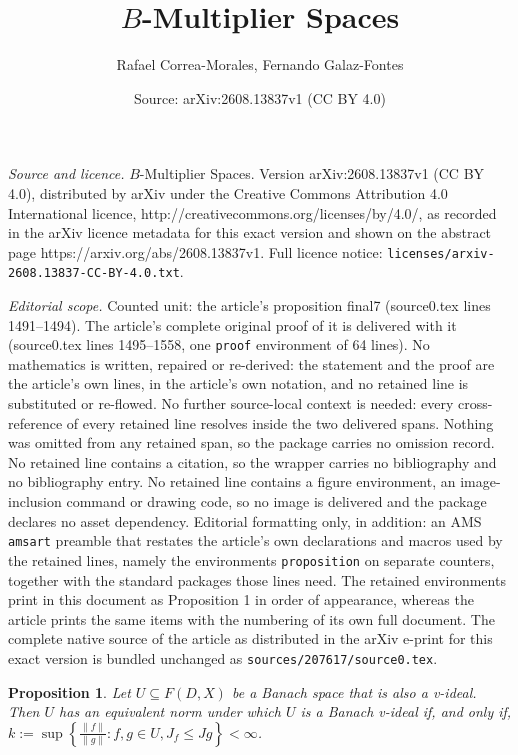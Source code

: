 \documentclass[10pt,a4paper]{amsart}
\title{$B$-Multiplier Spaces}
\author{Rafael Correa-Morales, Fernando Galaz-Fontes}
\date{Source: arXiv:2608.13837v1 (CC BY 4.0)}
\newtheorem{proposition}{Proposition}
\providecommand{\llave}[1]{\left\lbrace #1\right\rbrace }
\begin{document}
\maketitle

\noindent\emph{Source and licence.} $B$-Multiplier Spaces. Version arXiv:2608.13837v1 (CC BY 4.0), distributed by arXiv under the Creative Commons Attribution 4.0 International licence, http://creativecommons.org/licenses/by/4.0/, as recorded in the arXiv licence metadata for this exact version and shown on the abstract page https://arxiv.org/abs/2608.13837v1. Full licence notice: \texttt{licenses/arxiv-2608.13837-CC-BY-4.0.txt}.\par\smallskip

\noindent\textit{Editorial scope.} Counted unit: the article's proposition final7 (source0.tex lines 1491--1494). The article's complete original proof of it is delivered with it (source0.tex lines 1495--1558, one \texttt{proof} environment of 64 lines). No mathematics is written, repaired or re-derived: the statement and the proof are the article's own lines, in the article's own notation, and no retained line is substituted or re-flowed.  No further source-local context is needed: every cross-reference of every retained line resolves inside the two delivered spans.  Nothing was omitted from any retained span, so the package carries no omission record.  No retained line contains a citation, so the wrapper carries no bibliography and no bibliography entry.  No retained line contains a figure environment, an image-inclusion command or drawing code, so no image is delivered and the package declares no asset dependency.  Editorial formatting only, in addition: an AMS \texttt{amsart} preamble that restates the article's own declarations and macros used by the retained lines, namely the environments \texttt{proposition} on separate counters, together with the standard packages those lines need.  The retained environments print in this document as Proposition 1 in order of appearance, whereas the article prints the same items with the numbering of its own full document.  The complete native source of the article as distributed in the arXiv e-print for this exact version is bundled unchanged as \texttt{sources/207617/source0.tex}.
 \begin{proposition}\label{final7}
 	Let $U \subseteq F(D,X)$ be a Banach space that is also a v-ideal. Then $U$ has an equivalent norm under which $U$ is a Banach v-ideal if, and only if,
 	$k:=\sup \llave{ \frac{ \|f\|}{\|g\|}:   f, g  \in U, J_f \leq Jg } < \infty$.
 \end{proposition}
\end{document}
